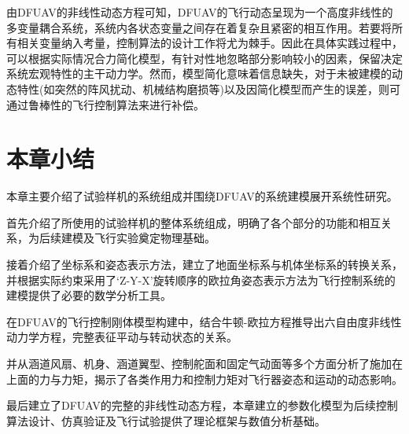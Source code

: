 由DFUAV的非线性动态方程可知，DFUAV的飞行动态呈现为一个高度非线性的多变量耦合系统，系统内各状态变量之间存在着复杂且紧密的相互作用。若要将所有相关变量纳入考量，控制算法的设计工作将尤为棘手。因此在具体实践过程中，可以根据实际情况合力简化模型，有针对性地忽略部分影响较小的因素，保留决定系统宏观特性的主干动力学。然而，模型简化意味着信息缺失，对于未被建模的动态特性(如突然的阵风扰动、机械结构磨损等)以及因简化模型而产生的误差，则可通过鲁棒性的飞行控制算法来进行补偿。

\section{本章小结}

本章主要介绍了试验样机的系统组成并围绕DFUAV的系统建模展开系统性研究。

首先介绍了所使用的试验样机的整体系统组成，明确了各个部分的功能和相互关系，为后续建模及飞行实验奠定物理基础。

接着介绍了坐标系和姿态表示方法，建立了地面坐标系与机体坐标系的转换关系，并根据实际约束采用了‘Z-Y-X’旋转顺序的欧拉角姿态表示方法为飞行控制系统的建模提供了必要的数学分析工具。

在DFUAV的飞行控制刚体模型构建中，结合牛顿-欧拉方程推导出六自由度非线性动力学方程，完整表征平动与转动状态的关系。

并从涵道风扇、机身、涵道翼型、控制舵面和固定气动面等多个方面分析了施加在上面的力与力矩，揭示了各类作用力和控制力矩对飞行器姿态和运动的动态影响。

最后建立了DFUAV的完整的非线性动态方程，本章建立的参数化模型为后续控制算法设计、仿真验证及飞行试验提供了理论框架与数值分析基础。
